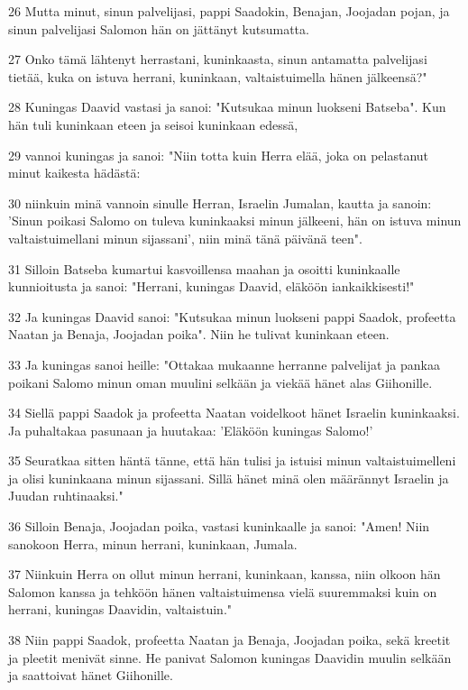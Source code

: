 \par 26 Mutta minut, sinun palvelijasi, pappi Saadokin, Benajan, Joojadan pojan, ja sinun palvelijasi Salomon hän on jättänyt kutsumatta.
\par 27 Onko tämä lähtenyt herrastani, kuninkaasta, sinun antamatta palvelijasi tietää, kuka on istuva herrani, kuninkaan, valtaistuimella hänen jälkeensä?"
\par 28 Kuningas Daavid vastasi ja sanoi: "Kutsukaa minun luokseni Batseba". Kun hän tuli kuninkaan eteen ja seisoi kuninkaan edessä,
\par 29 vannoi kuningas ja sanoi: "Niin totta kuin Herra elää, joka on pelastanut minut kaikesta hädästä:
\par 30 niinkuin minä vannoin sinulle Herran, Israelin Jumalan, kautta ja sanoin: 'Sinun poikasi Salomo on tuleva kuninkaaksi minun jälkeeni, hän on istuva minun valtaistuimellani minun sijassani', niin minä tänä päivänä teen".
\par 31 Silloin Batseba kumartui kasvoillensa maahan ja osoitti kuninkaalle kunnioitusta ja sanoi: "Herrani, kuningas Daavid, eläköön iankaikkisesti!"
\par 32 Ja kuningas Daavid sanoi: "Kutsukaa minun luokseni pappi Saadok, profeetta Naatan ja Benaja, Joojadan poika". Niin he tulivat kuninkaan eteen.
\par 33 Ja kuningas sanoi heille: "Ottakaa mukaanne herranne palvelijat ja pankaa poikani Salomo minun oman muulini selkään ja viekää hänet alas Giihonille.
\par 34 Siellä pappi Saadok ja profeetta Naatan voidelkoot hänet Israelin kuninkaaksi. Ja puhaltakaa pasunaan ja huutakaa: 'Eläköön kuningas Salomo!'
\par 35 Seuratkaa sitten häntä tänne, että hän tulisi ja istuisi minun valtaistuimelleni ja olisi kuninkaana minun sijassani. Sillä hänet minä olen määrännyt Israelin ja Juudan ruhtinaaksi."
\par 36 Silloin Benaja, Joojadan poika, vastasi kuninkaalle ja sanoi: "Amen! Niin sanokoon Herra, minun herrani, kuninkaan, Jumala.
\par 37 Niinkuin Herra on ollut minun herrani, kuninkaan, kanssa, niin olkoon hän Salomon kanssa ja tehköön hänen valtaistuimensa vielä suuremmaksi kuin on herrani, kuningas Daavidin, valtaistuin."
\par 38 Niin pappi Saadok, profeetta Naatan ja Benaja, Joojadan poika, sekä kreetit ja pleetit menivät sinne. He panivat Salomon kuningas Daavidin muulin selkään ja saattoivat hänet Giihonille.
